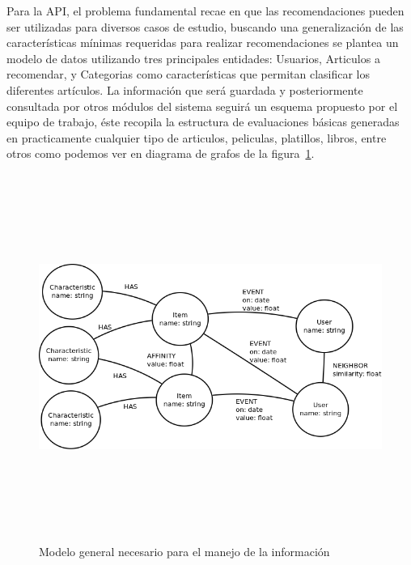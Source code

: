 Para la API, el problema fundamental recae en que las recomendaciones pueden ser utilizadas para diversos casos de estudio, buscando una generalización de las características mínimas requeridas para realizar recomendaciones se plantea un modelo de datos utilizando tres principales entidades: Usuarios, Articulos a recomendar, y Categorias como características que permitan clasificar los diferentes artículos. La información que será guardada y posteriormente consultada por otros módulos del sistema seguirá un esquema propuesto por el equipo de trabajo, éste recopila la estructura de evaluaciones básicas generadas en practicamente cualquier tipo de articulos, peliculas, platillos, libros, entre otros como podemos ver en diagrama de grafos de la figura~\ref{fig:min model}.

\newpage
\begin{landscape}
	\begin{figure}[h!]
		\centering
		\includegraphics[width=22.5cm,height=12cm]{./images/general_data_model.png}
		\caption{Modelo general necesario para el manejo de la información}
		\label{fig:min model}
	\end{figure}
\end{landscape}
\newpage
